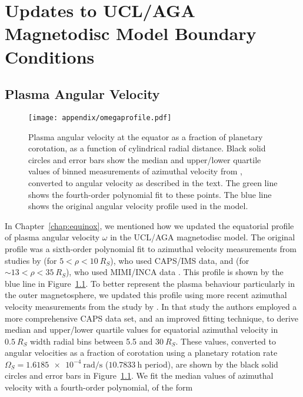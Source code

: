 \appendix
\chapter{Updates to UCL/AGA Magnetodisc Model Boundary Conditions} \label{appendix:sec:wilsonfits}
\section{Plasma Angular Velocity}\label{appendix:sec:plasmaomega}
\begin{figure}
\centering
\texttt{[image: appendix/omegaprofile.pdf]}
\caption[Equatorial profile of plasma angular velocity from \citet{wilson2017}, with best fit polynomial.]{Plasma angular velocity at the equator as a fraction of planetary corotation, as a function of cylindrical radial distance. Black solid circles and error bars show the median and upper/lower quartile values of binned measurements of azimuthal velocity from \citet{wilson2017}, converted to angular velocity as described in the text. The green line shows the fourth-order polynomial fit to these points. The blue line shows the original angular velocity profile used in the \citet{achilleos2010a} model.}
\label{appendix:fig:omegaprofile}
\end{figure}
\citet{alexeev2005,alexeev2006}
In Chapter~\ref{chap:equinox}, we mentioned how we updated the equatorial profile of plasma angular velocity $\omega$ in the UCL/AGA magnetodisc model. The original profile was a sixth-order polynomial fit to azimuthal velocity measurements from studies by \citet{wilson2008} (for $5<\rho<\SI{10}{R_S}$), who used CAPS/IMS data, and \citet{kane2008} (for ${\sim}13<\rho<\SI{35}{R_S}$), who used MIMI/INCA data \citep[more detail in][]{achilleos2010a}. This profile is shown by the blue line in Figure~\ref{appendix:fig:omegaprofile}. To better represent the plasma behaviour particularly in the outer magnetosphere, we updated this profile using more recent azimuthal velocity measurements from the study by \citet{wilson2017}. In that study the authors employed a more comprehensive CAPS data set, and an improved fitting technique, to derive median and upper/lower quartile values for equatorial azimuthal velocity in $\SI{0.5}{R_S}$ width radial bins between 5.5 and $\SI{30}{R_S}$. These values, converted to angular velocities as a fraction of corotation using a planetary rotation rate $\Omega_S = \SI{1.6185e-4}{\radian\per\second}$ ($\SI{10.7833}{\hour}$ period), are shown by the black solid circles and error bars in Figure~\ref{appendix:fig:omegaprofile}. We fit the median values of azimuthal velocity with a fourth-order polynomial, of the form 
